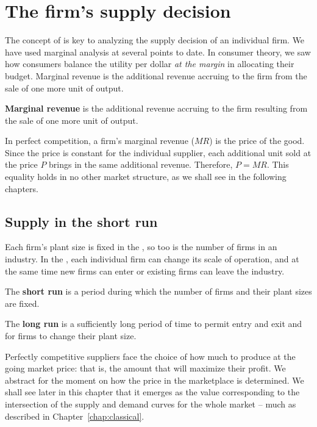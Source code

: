 \section{The firm's supply decision}\label{sec:ch9sec3}

The concept of  is key to analyzing the supply decision of an individual firm. We have used marginal analysis at several points to date. In consumer theory, we saw how consumers balance the utility per dollar \textit{at the margin} in allocating their budget. Marginal revenue is the additional revenue accruing to the firm from the sale of one more unit of output.

\begin{DefBox}
\textbf{Marginal revenue} is the additional revenue accruing to the firm resulting from the sale of one more unit of output.
\end{DefBox}

In perfect competition, a firm's marginal revenue ($MR$) is the price of the good. Since the price is constant for the individual supplier, each additional unit sold at the price $P$ brings in the same additional revenue. Therefore, $P=MR$. This equality holds in no other market structure, as we shall see in the following chapters.

\subsection*{Supply in the short run}

Each firm's plant size is fixed in the , so too is the number of firms in an industry. In the , each individual firm can change its scale of operation, and at the same time new firms can enter or existing firms can leave the industry.

\begin{DefBox}
The \textbf{short run} is a period during which the number of firms and their plant sizes are fixed.

The \textbf{long run} is a sufficiently long period of time to permit entry and exit and for firms to change their plant size.
\end{DefBox}

Perfectly competitive suppliers face the choice of how much to produce at the going market price: that is, the amount that will maximize their profit. We abstract for the moment on how the price in the marketplace is determined. We shall see later in this chapter that it emerges as the value corresponding to the intersection of the supply and demand curves for the whole market -- much as described in Chapter~\ref{chap:classical}. 

